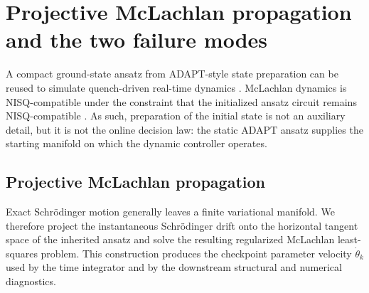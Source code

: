 \documentclass[
  reprint,
  amsmath,
  amssymb,
  aps,
  pra,
  nofootinbib,
  superscriptaddress,
  floatfix
]{revtex4-2}
\newcommand{\placeholder}[1]{\textcolor{red!70!black}{\ifmmode\left[#1\right]\else\textsf{[#1]}\fi}}
\begin{document}
\section{Projective McLachlan propagation and the two failure modes}
\label{sec:dynamics_method}


A compact ground-state ansatz from ADAPT-style state preparation can be reused to simulate quench-driven real-time dynamics \cite{Grimsley2019,Tang2021,Yordanov2021}. McLachlan dynamics is NISQ-compatible under the constraint that the initialized ansatz circuit remains NISQ-compatible \cite{McLachlan1964,LiBenjamin2017VQS,Yuan2019VQS}. %
As such, preparation of the initial state is not an auxiliary detail, but it is not the online decision law: the static ADAPT ansatz supplies the starting manifold on which the dynamic controller operates.

\subsection{Projective McLachlan propagation}
Exact Schr\"odinger motion generally leaves a finite variational manifold.  We therefore project the instantaneous Schr\"odinger drift onto the horizontal tangent space of the inherited ansatz and solve the resulting regularized McLachlan least-squares problem.  This construction produces the checkpoint parameter velocity $\dot\theta_k$ used by the time integrator and by the downstream structural and numerical diagnostics.
\end{document}
